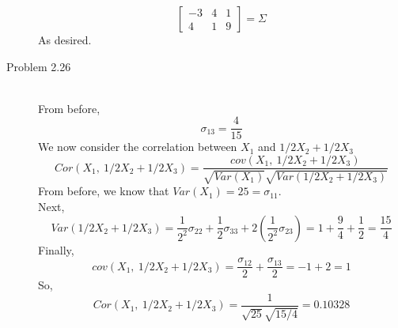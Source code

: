 \documentclass[letterpaper,10pt]{article}
\begin{document}
\begin{description}
\[\begin{bmatrix}
-3 & 4 & 1\\
4 & 1 & 9
\end{bmatrix}=\Sigma \]
As desired.
\item[Problem 2.26]\hfill\\
From before,
\[\sigma_{13}=\frac{4}{15}\]
We now consider the correlation between $X_1$ and $1/2X_2+1/2X_3$
\[Cor(X_1,\ 1/2X_2+1/2X_3)=\frac{cov(X_1,\ 1/2X_2+1/2X_3)}{\sqrt{Var(X_1)}\sqrt{Var(1/2X_2+1/2X_3)}}\]
From before, we know that $Var(X_1)=25=\sigma_{11}$.\\
Next,
\[Var(1/2X_2+1/2X_3)=\frac{1}{2^2}\sigma_{22}+\frac{1}{2}\sigma_{33}+2(\frac{1}{2^2}\sigma_{23})=1+\frac{9}{4}+\frac{1}{2}=\frac{15}{4}\]
Finally,
\[cov(X_1,\ 1/2X_2+1/2X_3)=\frac{\sigma_{12}}{2}+\frac{\sigma_{13}}{2}=-1+2=1\]
So,
\[Cor(X_1,\ 1/2X_2+1/2X_3)=\frac{1}{\sqrt{25}\sqrt{15/4}}=0.10328\]
\end{description}
\end{document}

